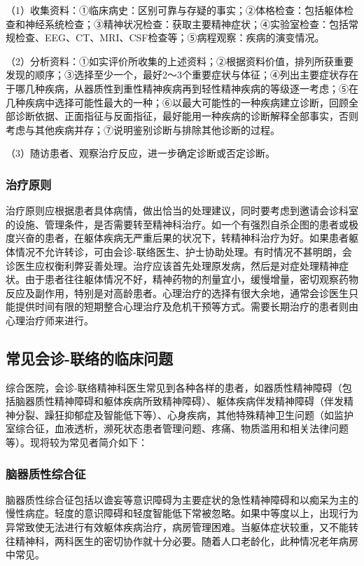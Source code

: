 （1）收集资料：①临床病史：区别可靠与存疑的事实；②体格检查：包括躯体检查和神经系统检查；③精神状况检查：获取主要精神症状；④实验室检查：包括常规检查、EEG、CT、MRI、CSF检查等；⑤病程观察：疾病的演变情况。

（2）分析资料：①如实评价所收集的上述资料；②根据资料价值，排列所获重要发现的顺序；③选择至少一个，最好2～3个重要症状与体征；④列出主要症状存在于哪几种疾病，从器质性到重性精神疾病再到轻性精神疾病的等级逐一考虑；⑤在几种疾病中选择可能性最大的一种；⑥以最大可能性的一种疾病建立诊断，回顾全部诊断依据、正面指征与反面指征，最好能用一种疾病的诊断解释全部事实，否则考虑与其他疾病并存；⑦说明鉴别诊断与排除其他诊断的过程。

（3）随访患者、观察治疗反应，进一步确定诊断或否定诊断。

\subsubsection{治疗原则}

治疗原则应根据患者具体病情，做出恰当的处理建议，同时要考虑到邀请会诊科室的设施、管理条件，是否需要转至精神科治疗。如一个有强烈自杀企图的患者或极度兴奋的患者，在躯体疾病无严重后果的状况下，转精神科治疗为好。如果患者躯体情况不允许转诊，可由会诊-联络医生、护士协助处理。有时情况不甚明朗，会诊医生应权衡利弊妥善处理。治疗应该首先处理原发病，然后是对症处理精神症状。由于患者往往躯体情况不好，精神药物的剂量宜小，缓慢增量，密切观察药物反应及副作用，特别是对高龄患者。心理治疗的选择有很大余地，通常会诊医生只能提供时间有限的短期整合心理治疗及危机干预等方式。需要长期治疗的患者则由心理治疗师来进行。

\subsection{常见会诊-联络的临床问题}

综合医院，会诊-联络精神科医生常见到各种各样的患者，如器质性精神障碍（包括脑器质性精神障碍和躯体疾病所致精神障碍）、躯体疾病伴发精神障碍（伴发精神分裂、躁狂抑郁症及智能低下等）、心身疾病，其他特殊精神卫生问题（如监护室综合征，血液透析，濒死状态患者管理问题、疼痛、物质滥用和相关法律问题等）。现将较为常见者简介如下：

\subsubsection{脑器质性综合征}

脑器质性综合征包括以谵妄等意识障碍为主要症状的急性精神障碍和以痴呆为主的慢性病症。轻度的意识障碍和轻度智能低下常被忽略。如果中等度以上，出现行为异常致使无法进行有效躯体疾病治疗，病房管理困难。当躯体症状较重，又不能转往精神科，两科医生的密切协作就十分必要。随着人口老龄化，此种情况老年病房中常见。

